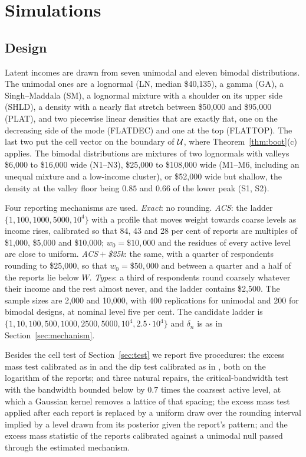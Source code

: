 \section{Simulations}\label{sec:sim}

\subsection{Design}

Latent incomes are drawn from seven unimodal and eleven bimodal distributions. The unimodal ones are a lognormal (LN, median \$40{,}135), a gamma (GA), a Singh--Maddala (SM), a lognormal mixture with a shoulder on its upper side (SHLD), a density with a nearly flat stretch between \$50{,}000 and \$95{,}000 (PLAT), and two piecewise linear densities that are exactly flat, one on the decreasing side of the mode (FLATDEC) and one at the top (FLATTOP). The last two put the cell vector on the boundary of $\mathcal{U}$, where Theorem~\ref{thm:boot}(c) applies. The bimodal distributions are mixtures of two lognormals with valleys \$6{,}000 to \$16{,}000 wide (N1--N3), \$25{,}000 to \$108{,}000 wide (M1--M6, including an unequal mixture and a low-income cluster), or \$52{,}000 wide but shallow, the density at the valley floor being $0.85$ and $0.66$ of the lower peak (S1, S2).

Four reporting mechanisms are used. \emph{Exact}: no rounding. \emph{ACS}: the ladder $\{1,\allowbreak 100,\allowbreak 1000,\allowbreak 5000,\allowbreak 10^4\}$ with a profile that moves weight towards coarse levels as income rises, calibrated so that 84, 43 and 28 per cent of reports are multiples of \$1{,}000, \$5{,}000 and \$10{,}000; $w_0=\$10{,}000$ and the residues of every active level are close to uniform. \emph{ACS${}+{}$\$25k}: the same, with a quarter of respondents rounding to \$25{,}000, so that $w_0=\$50{,}000$ and between a quarter and a half of the reports lie below $W$. \emph{Types}: a third of respondents round coarsely whatever their income and the rest almost never, and the ladder contains \$2{,}500. The sample sizes are 2{,}000 and 10{,}000, with 400 replications for unimodal and 200 for bimodal designs, at nominal level five per cent. The candidate ladder is $\{1,\allowbreak 10,\allowbreak 100,\allowbreak 500,\allowbreak 1000,\allowbreak 2500,\allowbreak 5000,\allowbreak 10^4,\allowbreak 2.5\cdot10^4\}$ and $\delta_n$ is as in Section~\ref{sec:mechanism}.

Besides the cell test of Section~\ref{sec:test} we report five procedures: the excess mass test calibrated as in \citet{AmeijeirasAlonsoCRC2019} and the dip test calibrated as in \citet{ChengHall1998}, both on the logarithm of the reports; and three natural repairs, the critical-bandwidth test with the bandwidth bounded below by $0.7$ times the coarsest active level, at which a Gaussian kernel removes a lattice of that spacing; the excess mass test applied after each report is replaced by a uniform draw over the rounding interval implied by a level drawn from its posterior given the report's pattern; and the excess mass statistic of the reports calibrated against a unimodal null passed through the estimated mechanism.

